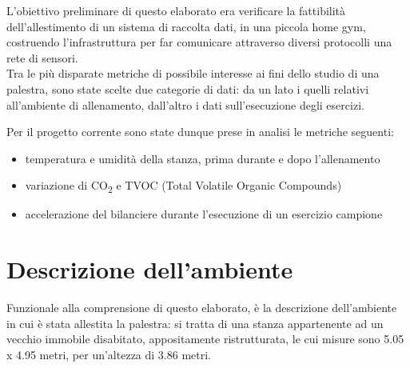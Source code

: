 \documentclass[fleqn,10pt]{SelfArx} %
\begin{document}





L'obiettivo preliminare di questo elaborato era verificare la fattibilità dell'allestimento di un sistema di 
raccolta dati, in una piccola home gym, costruendo l'infrastruttura per far comunicare 
attraverso diversi protocolli una rete di sensori.\\

Tra le più disparate metriche di possibile interesse ai fini dello studio di una palestra, 
sono state scelte due categorie di dati: da un lato i quelli relativi all'ambiente di allenamento, 
dall'altro i dati sull'esecuzione degli esercizi.

Per il progetto corrente sono state dunque prese in analisi le metriche seguenti:

\begin{itemize}[noitemsep] %
	\item temperatura e umidità della stanza, prima durante e dopo l'allenamento
	\item variazione di CO\textsubscript{2} e TVOC (Total Volatile Organic Compounds)
	\item accelerazione del bilanciere durante l'esecuzione di un esercizio campione
\end{itemize}

\section{Descrizione dell'ambiente}

Funzionale alla comprensione di questo elaborato, è la descrizione dell'ambiente in cui è stata allestita 
la palestra: si tratta di una stanza appartenente ad un vecchio immobile disabitato, appositamente 
ristrutturata, le cui misure sono 5.05 x 4.95 metri, per un'altezza di 3.86 metri. \\
\end{document}
